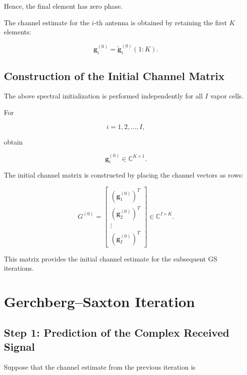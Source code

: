 \documentclass[12pt,a4paper]{article}
\begin{document}
Hence, the final element has zero phase.

The channel estimate for the $i$-th antenna is obtained by retaining the first $K$ elements:

\begin{equation}
\boxed{
\mathbf g_i^{(0)}
=
\widetilde{\mathbf g}_i^{(0)}(1:K)
}.
\tag{291}
\end{equation}

\subsection{Construction of the Initial Channel Matrix}

The above spectral initialization is performed independently for all $I$ vapor cells.

For

\begin{equation}
i=1,2,\ldots,I,
\tag{292}
\end{equation}

obtain

\begin{equation}
\mathbf g_i^{(0)}
\in
\mathbb C^{K\times1}.
\tag{293}
\end{equation}

The initial channel matrix is constructed by placing the channel vectors as rows:

\begin{equation}
\boxed{
G^{(0)}
=
\begin{bmatrix}
(\mathbf g_1^{(0)})^T\\
(\mathbf g_2^{(0)})^T\\
\vdots\\
(\mathbf g_I^{(0)})^T
\end{bmatrix}
\in
\mathbb C^{I\times K}
}.
\tag{294}
\end{equation}

This matrix provides the initial channel estimate for the subsequent GS iterations.

\section{Gerchberg--Saxton Iteration}

\subsection{Step 1: Prediction of the Complex Received Signal}

Suppose that the channel estimate from the previous iteration is
\end{document}
